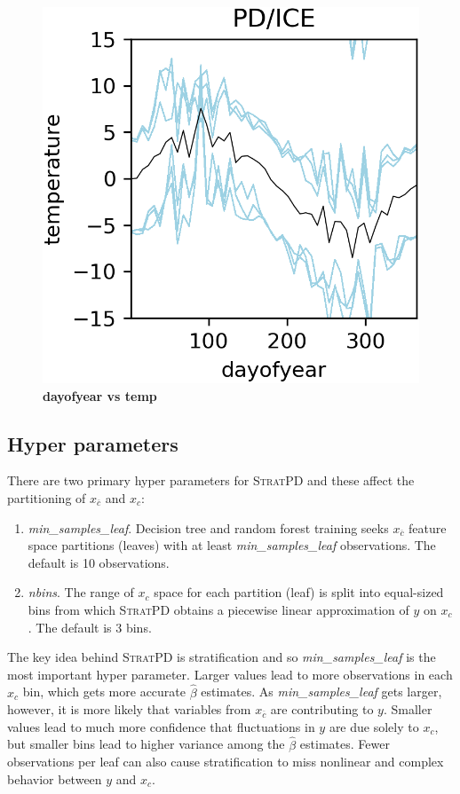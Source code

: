 \documentclass[12pt]{article}
\newcommand{\spd}{\fontfamily{cmr}\textsc{\small StratPD}}
\newcommand{\xnc}{$x_{\overline{c}}$}
\begin{document}
\begin{figure}[htbp]
\begin{center}
\includegraphics[scale=0.7]{images/dayofyear_vs_temp_pdp.png}
\caption{{\bf  dayofyear  vs temp}}
\label{fig:dayofyear_vs_temp}
\end{center}
\end{figure}

\subsection{Hyper parameters}

There are two primary hyper parameters for \spd{} and these affect the partitioning of \xnc{} and $x_c$:

\begin{enumerate}
\item {\it min\_samples\_leaf}.  Decision tree and random forest training seeks \xnc{} feature space partitions (leaves) with at least {\it min\_samples\_leaf} observations. The default is 10 observations.
\item {\it nbins}. The range of $x_c$ space for each partition (leaf) is split into equal-sized bins from which \spd{} obtains a piecewise linear approximation of $y$ on $x_c$. The default is 3 bins.
\end{enumerate}

The key idea behind \spd{} is stratification and so {\it min\_samples\_leaf} is the most important hyper parameter. Larger values lead to more observations in each $x_c$ bin, which gets more accurate $\hat{\beta}$ estimates. As {\it min\_samples\_leaf} gets larger, however, it is more likely that variables from \xnc{} are contributing to $y$.  Smaller values lead to much more confidence that fluctuations in $y$ are due solely to $x_c$, but smaller bins lead to higher variance among the $\hat{\beta}$ estimates. Fewer observations per leaf can also cause stratification to miss nonlinear and complex behavior between $y$ and $x_c$.
\end{document}
